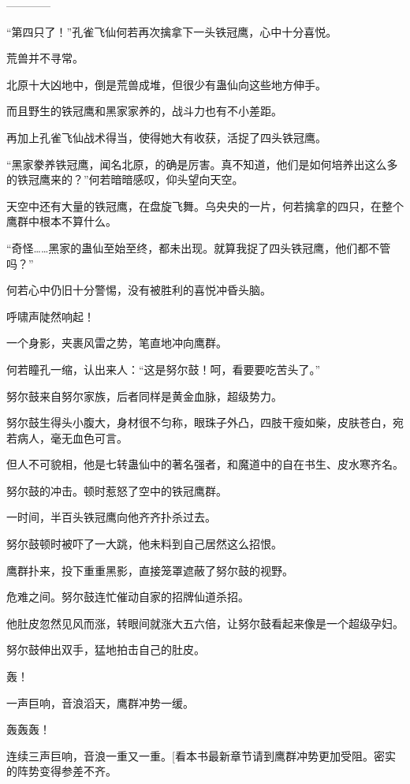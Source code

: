 
\begin{this_body}

------------

“第四只了！”孔雀飞仙何若再次擒拿下一头铁冠鹰，心中十分喜悦。

荒兽并不寻常。

北原十大凶地中，倒是荒兽成堆，但很少有蛊仙向这些地方伸手。

而且野生的铁冠鹰和黑家家养的，战斗力也有不小差距。

再加上孔雀飞仙战术得当，使得她大有收获，活捉了四头铁冠鹰。

“黑家豢养铁冠鹰，闻名北原，的确是厉害。真不知道，他们是如何培养出这么多的铁冠鹰来的？”何若暗暗感叹，仰头望向天空。

天空中还有大量的铁冠鹰，在盘旋飞舞。乌央央的一片，何若擒拿的四只，在整个鹰群中根本不算什么。

“奇怪……黑家的蛊仙至始至终，都未出现。就算我捉了四头铁冠鹰，他们都不管吗？”

何若心中仍旧十分警惕，没有被胜利的喜悦冲昏头脑。

呼啸声陡然响起！

一个身影，夹裹风雷之势，笔直地冲向鹰群。

何若瞳孔一缩，认出来人：“这是努尔鼓！呵，看要要吃苦头了。”

努尔鼓来自努尔家族，后者同样是黄金血脉，超级势力。

努尔鼓生得头小腹大，身材很不匀称，眼珠子外凸，四肢干瘦如柴，皮肤苍白，宛若病人，毫无血色可言。

但人不可貌相，他是七转蛊仙中的著名强者，和魔道中的自在书生、皮水寒齐名。

努尔鼓的冲击。顿时惹怒了空中的铁冠鹰群。

一时间，半百头铁冠鹰向他齐齐扑杀过去。

努尔鼓顿时被吓了一大跳，他未料到自己居然这么招恨。

鹰群扑来，投下重重黑影，直接笼罩遮蔽了努尔鼓的视野。

危难之间。努尔鼓连忙催动自家的招牌仙道杀招。

他肚皮忽然见风而涨，转眼间就涨大五六倍，让努尔鼓看起来像是一个超级孕妇。

努尔鼓伸出双手，猛地拍击自己的肚皮。

轰！

一声巨响，音浪滔天，鹰群冲势一缓。

轰轰轰！

连续三声巨响，音浪一重又一重。[看本书最新章节请到鹰群冲势更加受阻。密实的阵势变得参差不齐。


\end{this_body}
